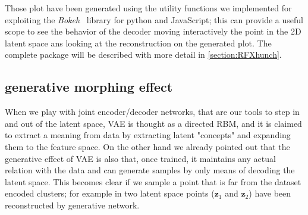 Those plot have been generated using the utility functions we implemented for \RFXhunch exploiting the \textit{Bokeh}~\cite{bokeh} library for python and JavaScript; this can provide a useful scope to see the behavior of the decoder moving interactively the point in the 2D latent space ans looking at the reconstruction on the generated plot.
The complete \RFXhunch package will be described with more detail in \cref{section:RFXhunch}.
%
\subsection{generative morphing effect}
When we play with joint encoder/decoder networks, that are our tools to step in and out of the latent space, \acs{VAE} is thought as a directed \acs{RBM}, and it is claimed to extract a meaning from data by extracting latent "concepts" and expanding them to the feature space. On the other hand we already pointed out that the generative effect of \acs{VAE} is also that, once trained, it maintains any actual relation with the data and can generate samples by only means of decoding the latent space. This becomes clear if we sample a point that is far from the dataset encoded clusters; for example in \Figure{\ref{fig:step1_morph}} two latent space points ($\bm{z}_1$ and $\bm{z}_2$) have been reconstructed by generative network. 
%
